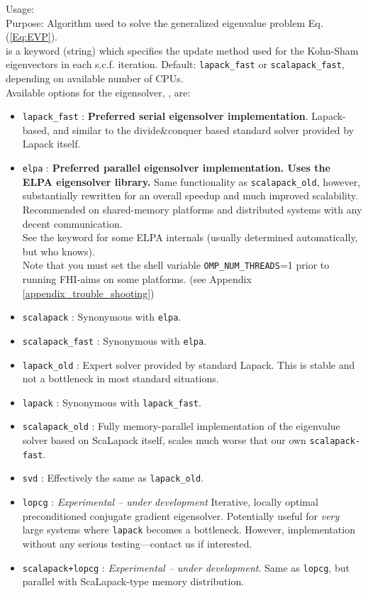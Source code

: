{
  \noindent 
  Usage:   \\[1.0ex]
  Purpose: Algorithm used to solve the generalized eigenvalue problem
    Eq. (\ref{Eq:EVP}). \\[1.0ex]
   is a keyword (string) which specifies the update
    method used for the Kohn-Sham eigenvectors in each
    s.c.f. iteration. Default: \texttt{lapack\_fast} or
  \texttt{scalapack\_fast}, depending on available number of CPUs. \\ 
}
Available options for the eigensolver, , are:
\begin{itemize}
  \item \texttt{lapack\_fast} : \textbf{Preferred 
    serial eigensolver implementation}. Lapack-based, and similar to the
    divide\&conquer based standard solver provided by Lapack itself.
  \item \texttt{elpa} : \textbf{Preferred 
    parallel eigensolver implementation. Uses the ELPA eigensolver library.}
    Same functionality as \texttt{scalapack\_old}, however, substantially rewritten for
    an overall speedup and much improved scalability. Recommended on
    shared-memory platforms and distributed systems with any decent
    communication. \\
    See the  keyword for some ELPA internals (usually
    determined automatically, but who knows). \\
    Note that you must set the
    shell variable \texttt{OMP\_NUM\_THREADS}=1 prior to running
    FHI-aims on some platforms. (see Appendix \ref{appendix_trouble_shooting})
  \item \texttt{scalapack} : Synonymous with \texttt{elpa}.
  \item \texttt{scalapack\_fast} : Synonymous with \texttt{elpa}.
  \item \texttt{lapack\_old} : Expert solver provided by standard
    Lapack. This is stable and not a bottleneck in most standard
    situations. 
  \item \texttt{lapack} : Synonymous with \texttt{lapack\_fast}.
  \item \texttt{scalapack\_old} :  Fully memory-parallel implementation of 
    the eigenvalue solver based on ScaLapack itself, scales much worse that
    our own \texttt{scalapack-fast}. 
  \item \texttt{svd} : Effectively the same as \texttt{lapack\_old}. 
  \item \texttt{lopcg} : \emph{Experimental -- under development}
    Iterative, locally optimal preconditioned conjugate gradient
    eigensolver. Potentially useful for \emph{very} large systems
    where \texttt{lapack} becomes a bottleneck. However,
    implementation without any serious testing---contact us if
    interested. 
  \item \texttt{scalapack+lopcg} : \emph{Experimental -- under
    development}. Same as \texttt{lopcg}, but parallel with
    ScaLapack-type memory distribution.
\end{itemize}
